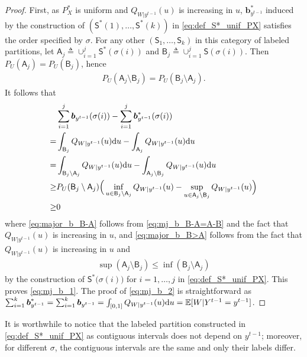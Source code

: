 \documentclass{article}
\newcommand{\E}{\mathbb{E}}
\def\sA{{\mathsf A}}
\def\sS{{\mathsf S}}
\def\rd{{\rm d}}
\def\deq{\triangleq}
\begin{document}
\begin{proof}
First, as $P_X^*$ is uniform and $Q_{W|y^{t-1}}(u)$ is increasing in $u$, $\boldsymbol{b}_{y^{t-1}}^*$ induced by the construction of $(\sS^*(1),\ldots, \sS^*(k))$ in \eqref{eq:def_S*_unif_PX} satisfies the order specified by $\sigma$.
For any other $(\sS_1,\ldots,\sS_k)$ in this category of labeled partitions, let $\sA_j \deq \cup_{i=1}^j \sS^*({\sigma(i)})$ and ${\mathsf B}_j \deq \cup_{i=1}^j \sS(\sigma(i))$. Then $P_U(\sA_j) = P_U(\mathsf B_j)$, hence
\begin{align}
    P_U(\sA_j\setminus\mathsf B_j) = P_U(\mathsf B_j \setminus \sA_j) . \label{eq:mj_b_B-A=A-B}
\end{align}
It follows that
\begin{align}
& \sum_{i=1}^j \boldsymbol{b}_{y^{t-1}} (\sigma(i)) 
-
\sum_{i=1}^j \boldsymbol{b}_{y^{t-1}} ^*(\sigma(i)) \nonumber \\
=& 
\int_{\mathsf B_j} Q_{W|y^{t-1}}(u) \rd u 
-
\int_{\sA_j} Q_{W|y^{t-1}}(u) \rd u \\
=& \int_{\mathsf B_j\setminus\sA_j} Q_{W|y^{t-1}}(u) \rd u 
-
\int_{\sA_j\setminus\mathsf B_j} Q_{W|y^{t-1}}(u) \rd u \\
\ge& P_U(\mathsf B_j \setminus \sA_j) \Big( \inf_{u\in \mathsf B_j \setminus \sA_j} Q_{W|y^{t-1}}(u) - \sup_{u\in \mathsf A_j \setminus \mathsf B_j} Q_{W|y^{t-1}}(u)\Big) \label{eq:major_b_B-A} \\
\ge & 0  \label{eq:major_b_B>A}
\end{align}
where \eqref{eq:major_b_B-A} follows from \eqref{eq:mj_b_B-A=A-B} and the fact that $Q_{W|y^{t-1}}(u)$ is increasing in $u$, and \eqref{eq:major_b_B>A} follows from the fact that $Q_{W|y^{t-1}}(u)$ is increasing in $u$ and 
\begin{align}
    \sup( \sA_j\setminus\mathsf B_j )
\le 
    \inf( \mathsf B_j\setminus\sA_j )
\end{align}
by the construction of $\sS^*({\sigma(i))}$ for $i=1,\ldots,j$ in \eqref{eq:def_S*_unif_PX}.
This proves \eqref{eq:mj_b_1}.
The proof of \eqref{eq:mj_b_2} is straightforward as
$    \sum_{i=1}^k \boldsymbol{b}_{y^{t-1}} ^*
    =
    \sum_{i=1}^k \boldsymbol{b}_{y^{t-1}} 
    = \int_{[0,1]} Q_{W|y^{t-1}}(u) \rd u  = \E[W|Y^{t-1}=y^{t-1}]$.
\end{proof}
It is worthwhile to notice that the labeled partition constructed in \eqref{eq:def_S*_unif_PX} as contiguous intervals does not depend on $y^{t-1}$; moreover, for different $\sigma$, the contiguous intervals are the same and only their labels differ.
\end{document}
